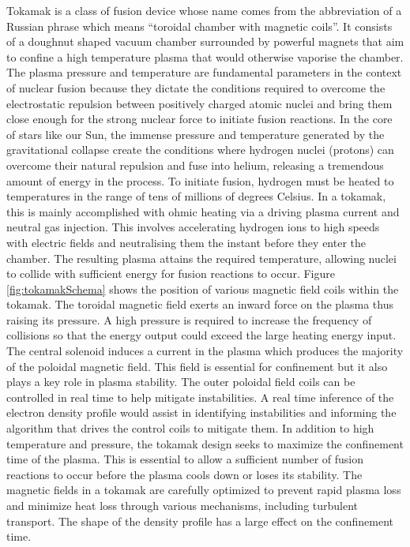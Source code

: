 Tokamak is a class of fusion device whose name comes from the abbreviation of a Russian phrase which means ``toroidal chamber with magnetic coils''. It consists of a doughnut shaped vacuum chamber surrounded by powerful magnets that aim to confine a high temperature plasma that would otherwise vaporise the chamber. The plasma pressure and temperature are fundamental parameters in the context of nuclear fusion because they dictate the conditions required to overcome the electrostatic repulsion between positively charged atomic nuclei and bring them close enough for the strong nuclear force to initiate fusion reactions. In the core of stars like our Sun, the immense pressure and temperature generated by the gravitational collapse create the conditions where hydrogen nuclei (protons) can overcome their natural repulsion and fuse into helium, releasing a tremendous amount of energy in the process. To initiate fusion, hydrogen must be heated to temperatures in the range of tens of millions of degrees Celsius. In a tokamak, this is mainly accomplished with ohmic heating via a driving plasma current and neutral gas injection. This involves accelerating hydrogen ions to high speeds with electric fields and neutralising them the instant before they enter the chamber. The resulting plasma attains the required temperature, allowing nuclei to collide with sufficient energy for fusion reactions to occur. Figure \ref{fig:tokamakSchema} shows the position of various magnetic field coils within the tokamak. The toroidal magnetic field exerts an inward force on the plasma thus raising its pressure. A high pressure is required to increase the frequency of collisions so that the energy output could exceed the large heating energy input. The central solenoid induces a current in the plasma which produces the majority of the poloidal magnetic field. This field is essential for confinement but it also plays a key role in plasma stability. The outer poloidal field coils can be controlled in real time to help mitigate instabilities. A real time inference of the electron density profile would assist in identifying instabilities and informing the algorithm that drives the control coils to mitigate them. In addition to high temperature and pressure, the tokamak design seeks to maximize the confinement time of the plasma. This is essential to allow a sufficient number of fusion reactions to occur before the plasma cools down or loses its stability. The magnetic fields in a tokamak are carefully optimized to prevent rapid plasma loss and minimize heat loss through various mechanisms, including turbulent transport. The shape of the density profile has a large effect on the confinement time.

